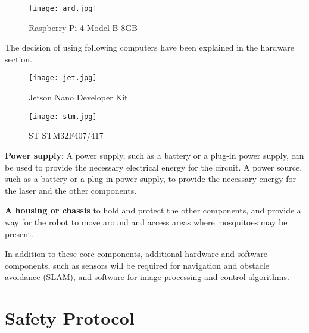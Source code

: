 \documentclass[11pt]{article}
\begin{document}
		 \begin{center}
		
		
		\begin{figure}[H]
			\centering
			\texttt{[image: ard.jpg]}
			\caption{ Raspberry Pi 4 Model B 8GB }
			\label{fig:Flowchart}
		\end{figure}
	\end{center}

The decision of using following computers have been explained in the hardware section.
	 \begin{center}
	
	
	\begin{figure}[H]
		\centering
		\texttt{[image: jet.jpg]}
		\caption{ Jetson Nano Developer Kit }
		\label{fig:Flowchart}
	\end{figure}
\end{center}
 \begin{center}
	
	
	\begin{figure}[H]
		\centering
		\texttt{[image: stm.jpg]}
		\caption{ST STM32F407/417 }
		\label{fig:Flowchart}
	\end{figure}
\end{center}




	
	\textbf{Power supply}: A power supply, such as a battery or a plug-in power supply, can be used to provide the necessary electrical energy for the circuit.
		A power source, such as a battery or a plug-in power supply, to provide the necessary energy for the laser and the other components.
	
	
	

	

	

	
\textbf{	A housing or chassis} to hold and protect the other components, and provide a way for the robot to move around and access areas where mosquitoes may be present.
	
	In addition to these core components, additional hardware and software components, such as sensors will be required for navigation and obstacle avoidance (SLAM), and software for image processing and control algorithms.
	
	
	
	


	

	
		\section{Safety Protocol}
	
\end{document}
